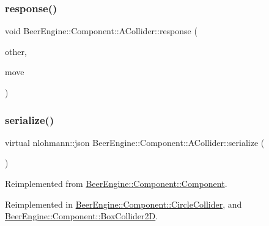 \subsubsection{\texorpdfstring{response()}{response()}}
{\footnotesize\ttfamily void Beer\+Engine\+::\+Component\+::\+A\+Collider\+::response (\begin{DoxyParamCaption}\item[{\mbox{\hyperlink{class_beer_engine_1_1_component_1_1_a_collider}{A\+Collider}} $\ast$}]{other,  }\item[{glm\+::vec3}]{move }\end{DoxyParamCaption})}

\mbox{\label{class_beer_engine_1_1_component_1_1_a_collider_aecc5eb364d52beede07428ba1b668e09}} 
\subsubsection{\texorpdfstring{serialize()}{serialize()}}
{\footnotesize\ttfamily virtual nlohmann\+::json Beer\+Engine\+::\+Component\+::\+A\+Collider\+::serialize (\begin{DoxyParamCaption}{ }\end{DoxyParamCaption})\hspace{0.3cm}{\ttfamily [virtual]}}



Reimplemented from \mbox{\hyperlink{class_beer_engine_1_1_component_1_1_component_a4d82d8a6b22b93514e0585fa4073041f}{Beer\+Engine\+::\+Component\+::\+Component}}.



Reimplemented in \mbox{\hyperlink{class_beer_engine_1_1_component_1_1_circle_collider_a9898927635bb575aa2895cc5516433fc}{Beer\+Engine\+::\+Component\+::\+Circle\+Collider}}, and \mbox{\hyperlink{class_beer_engine_1_1_component_1_1_box_collider2_d_a9172319becb9c609206265378ad04724}{Beer\+Engine\+::\+Component\+::\+Box\+Collider2D}}.

\mbox{\label{class_beer_engine_1_1_component_1_1_a_collider_a5da2e0713f11237c7a963295f508cd3b}} 
